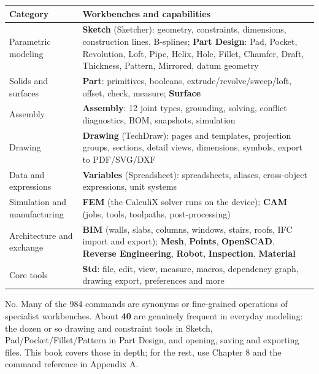 \begin{center}
\small
\begin{tabularx}{\linewidth}{@{}lX@{}}
\toprule
\textbf{Category} & \textbf{Workbenches and capabilities} \\
\midrule
Parametric modeling & \textbf{Sketch} (Sketcher): geometry, constraints, dimensions, construction lines,
B-splines; \textbf{Part Design}: Pad, Pocket, Revolution, Loft, Pipe, Helix, Hole, Fillet, Chamfer, Draft,
Thickness, Pattern, Mirrored, datum geometry \\
Solids and surfaces & \textbf{Part}: primitives, booleans, extrude/revolve/sweep/loft, offset, check,
measure; \textbf{Surface} \\
Assembly & \textbf{Assembly}: 12 joint types, grounding, solving, conflict diagnostics, BOM, snapshots,
simulation \\
Drawing & \textbf{Drawing} (TechDraw): pages and templates, projection groups, sections, detail views,
dimensions, symbols, export to PDF/SVG/DXF \\
Data and expressions & \textbf{Variables} (Spreadsheet): spreadsheets, aliases, cross-object expressions,
unit systems \\
Simulation and manufacturing & \textbf{FEM} (the CalculiX solver runs on the device); \textbf{CAM} (jobs,
tools, toolpaths, post-processing) \\
Architecture and exchange & \textbf{BIM} (walls, slabs, columns, windows, stairs, roofs, IFC import and
export); \textbf{Mesh}, \textbf{Points}, \textbf{OpenSCAD}, \textbf{Reverse Engineering}, \textbf{Robot},
\textbf{Inspection}, \textbf{Material} \\
Core tools & \textbf{Std}: file, edit, view, measure, macros, dependency graph, drawing export, preferences
and more \\
\bottomrule
\end{tabularx}
\end{center}

\begin{tip}
No. Many of the 984 commands are synonyms or fine-grained operations of specialist workbenches. About
\textbf{40} are genuinely frequent in everyday modeling: the dozen or so drawing and constraint tools in
Sketch, Pad/Pocket/Fillet/Pattern in Part Design, and opening, saving and exporting files. This book covers
those in depth; for the rest, use Chapter 8 and the command reference in Appendix A.
\end{tip}

